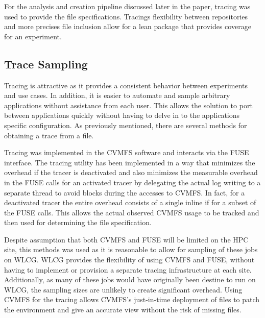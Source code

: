 \documentclass[conference]{IEEEtran}
\begin{document}
For the analysis and creation pipeline discussed
later in the paper, tracing was used to provide
the file specifications. 
Tracings flexibility between repositories
and more precises file inclusion allow
for a lean package that provides coverage for
an experiment.

\subsection{Trace Sampling}
Tracing is attractive as it provides a consistent 
behavior between experiments and use cases.
In addition, it is easier to automate and sample arbitrary applications without assistance from each user.
This allows the solution to port between applications
quickly without having to delve in to the applications
specific configuration.
As previously mentioned, there are several methods for
obtaining a trace from a file.

Tracing was implemented in the CVMFS software and
interacts via the FUSE interface.
The tracing utility has been implemented in a way that 
minimizes the overhead if the tracer is deactivated and 
also minimizes the measurable overhead in the FUSE calls for an activated tracer 
by delegating the actual log writing to a separate thread to avoid blocks 
during the accesses to CVMFS. 
In fact, for a deactivated tracer the entire overhead consists of 
a single inline if for a subset of the FUSE calls.
This allows the actual observed CVMFS usage to  be tracked
and then used for determining the file specification.

Despite assumption that both CVMFS and FUSE will be limited
on the HPC site, this methods was used as it is reasonable to
allow for sampling of these jobs on WLCG. 
WLCG provides the flexibility of using CVMFS and FUSE, without
having to implement or provision a separate tracing infrastructure
at each site.
Additionally, as many of these jobs would have originally been 
destine to run on WLCG, the sampling sizes are unlikely to 
create significant overhead.
Using CVMFS for the tracing allows CVMFS's just-in-time deployment
of files to patch the environment and give an accurate view without
the risk of missing files.
\end{document}
